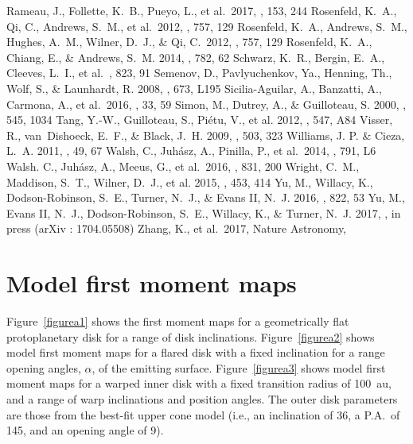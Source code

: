 \documentclass[onecolumn]{aastex6}
\begin{document}
\begin{thebibliography}{}
 Rameau, J., Follette, K.~B., Pueyo, L., et al.~2017, \aj, 153, 244
 Rosenfeld, K.~A., Qi, C., Andrews, S.~M., et al.~2012, \apj, 757, 129
 Rosenfeld, K.~A., Andrews, S.~M., Hughes, A.~M., Wilner, D.~J., \& Qi, C.~2012, \apj, 757, 129
 Rosenfeld, K.~A., Chiang, E., \& Andrews, S.~M. 2014, \apj, 782, 62
 Schwarz, K.~R., Bergin, E.~A., Cleeves, L.~I., et al.~\apj, 823, 91
 Semenov, D., Pavlyuchenkov, Ya., Henning, Th., Wolf, S., \& Launhardt, R. 2008, \apjl, 673, L195  
 Sicilia-Aguilar, A., Banzatti, A., Carmona, A., et al.~2016, \pasa, 33, 59
 Simon, M., Dutrey, A., \& Guilloteau, S. 2000, \apj, 545, 1034
 Tang, Y.-W., Guilloteau, S., Pi\'{e}tu, V., et al. 2012, \aap, 547, A84
 Visser, R., van~Dishoeck, E.~F., \& Black, J.~H. 2009, \aap, 503, 323
 Williams, J. P. \& Cieza, L.~A. 2011, \araa, 49, 67
 Walsh, C., Juh\'{a}sz, A., Pinilla, P., et al.~2014, \apjl, 791, L6
 Walsh. C., Juh\'{a}sz, A., Meeus, G., et al.~2016, \apj, 831, 200
 Wright, C.~M., Maddison, S.~T., Wilner, D.~J., et al. 2015, \mnras, 453, 414
 Yu, M., Willacy, K., Dodson-Robinson, S.~E., Turner, N.~J., \& Evans II, N.~J. 2016, \apj, 822, 53  
 Yu, M., Evans II, N.~J., Dodson-Robinson, S.~E., Willacy, K., \& Turner, N.~J. 2017, \apj, in press (arXiv : 1704.05508)
 Zhang, K., et al.~2017, Nature Astronomy, 
\end{thebibliography}

\appendix

\section{Model first moment maps}

Figure~\ref{figurea1} shows the first moment maps for a geometrically 
flat protoplanetary disk for a range of disk inclinations.  
Figure~\ref{figurea2} shows model first moment maps for a flared 
disk with a fixed inclination for a range opening angles, $\alpha$, of the emitting 
surface. 
Figure~\ref{figurea3} shows model first moment maps for a warped inner disk 
with a fixed transition radius of 100~au, and a range 
of warp inclinations and position angles.  
The outer disk parameters are those from the best-fit upper cone model 
(i.e., an inclination of 36\degree, a P.A.~of 145\degree, and an opening angle 
of 9\degree).
\end{document}
